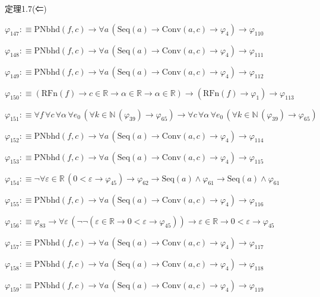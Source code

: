 \begin{fullproof}{定理1.7(⇐)}
\begin{abbrevlist}
\item $\varphi_{147} :\equiv \mathrm{PNbhd}(f,c) \to \forall a\,(\mathrm{Seq}(a) \to \mathrm{Conv}(a,c) \to \varphi_{4}) \to \varphi_{110}$
\item $\varphi_{148} :\equiv \mathrm{PNbhd}(f,c) \to \forall a\,(\mathrm{Seq}(a) \to \mathrm{Conv}(a,c) \to \varphi_{4}) \to \varphi_{111}$
\item $\varphi_{149} :\equiv \mathrm{PNbhd}(f,c) \to \forall a\,(\mathrm{Seq}(a) \to \mathrm{Conv}(a,c) \to \varphi_{4}) \to \varphi_{112}$
\item $\varphi_{150} :\equiv (\mathrm{RFn}(f) \to c \in \mathbb{R} \to \alpha \in \mathbb{R} \to \alpha \in \mathbb{R}) \to (\mathrm{RFn}(f) \to \varphi_{1}) \to \varphi_{113}$
\item $\varphi_{151} :\equiv \forall f\,\forall c\,\forall \alpha\,\forall e_{0}\,(\forall k \in \mathbb{N}\,(\varphi_{39}) \to \varphi_{65}) \to \forall c\,\forall \alpha\,\forall e_{0}\,(\forall k \in \mathbb{N}\,(\varphi_{39}) \to \varphi_{65})$
\item $\varphi_{152} :\equiv \mathrm{PNbhd}(f,c) \to \forall a\,(\mathrm{Seq}(a) \to \mathrm{Conv}(a,c) \to \varphi_{4}) \to \varphi_{114}$
\item $\varphi_{153} :\equiv \mathrm{PNbhd}(f,c) \to \forall a\,(\mathrm{Seq}(a) \to \mathrm{Conv}(a,c) \to \varphi_{4}) \to \varphi_{115}$
\item $\varphi_{154} :\equiv \neg \forall \varepsilon \in \mathbb{R}\,(0 < \varepsilon \to \varphi_{45}) \to \varphi_{62} \to \mathrm{Seq}(a) \land \varphi_{61} \to \mathrm{Seq}(a) \land \varphi_{61}$
\item $\varphi_{155} :\equiv \mathrm{PNbhd}(f,c) \to \forall a\,(\mathrm{Seq}(a) \to \mathrm{Conv}(a,c) \to \varphi_{4}) \to \varphi_{116}$
\item $\varphi_{156} :\equiv \varphi_{83} \to \forall \varepsilon\,(\neg \neg (\varepsilon \in \mathbb{R} \to 0 < \varepsilon \to \varphi_{45})) \to \varepsilon \in \mathbb{R} \to 0 < \varepsilon \to \varphi_{45}$
\item $\varphi_{157} :\equiv \mathrm{PNbhd}(f,c) \to \forall a\,(\mathrm{Seq}(a) \to \mathrm{Conv}(a,c) \to \varphi_{4}) \to \varphi_{117}$
\item $\varphi_{158} :\equiv \mathrm{PNbhd}(f,c) \to \forall a\,(\mathrm{Seq}(a) \to \mathrm{Conv}(a,c) \to \varphi_{4}) \to \varphi_{118}$
\item $\varphi_{159} :\equiv \mathrm{PNbhd}(f,c) \to \forall a\,(\mathrm{Seq}(a) \to \mathrm{Conv}(a,c) \to \varphi_{4}) \to \varphi_{119}$

\end{abbrevlist}
\end{fullproof}
